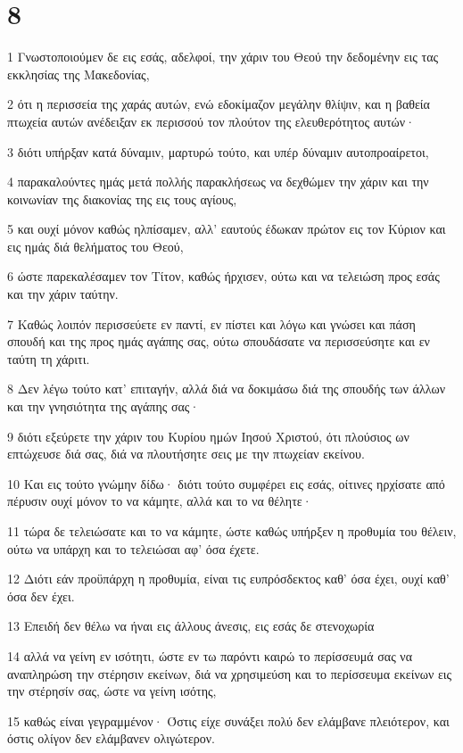 \chapter{8}

\par 1 Γνωστοποιούμεν δε εις εσάς, αδελφοί, την χάριν του Θεού την δεδομένην εις τας εκκλησίας της Μακεδονίας,
\par 2 ότι η περισσεία της χαράς αυτών, ενώ εδοκίμαζον μεγάλην θλίψιν, και η βαθεία πτωχεία αυτών ανέδειξαν εκ περισσού τον πλούτον της ελευθερότητος αυτών·
\par 3 διότι υπήρξαν κατά δύναμιν, μαρτυρώ τούτο, και υπέρ δύναμιν αυτοπροαίρετοι,
\par 4 παρακαλούντες ημάς μετά πολλής παρακλήσεως να δεχθώμεν την χάριν και την κοινωνίαν της διακονίας της εις τους αγίους,
\par 5 και ουχί μόνον καθώς ηλπίσαμεν, αλλ' εαυτούς έδωκαν πρώτον εις τον Κύριον και εις ημάς διά θελήματος του Θεού,
\par 6 ώστε παρεκαλέσαμεν τον Τίτον, καθώς ήρχισεν, ούτω και να τελειώση προς εσάς και την χάριν ταύτην.
\par 7 Καθώς λοιπόν περισσεύετε εν παντί, εν πίστει και λόγω και γνώσει και πάση σπουδή και της προς ημάς αγάπης σας, ούτω σπουδάσατε να περισσεύσητε και εν ταύτη τη χάριτι.
\par 8 Δεν λέγω τούτο κατ' επιταγήν, αλλά διά να δοκιμάσω διά της σπουδής των άλλων και την γνησιότητα της αγάπης σας·
\par 9 διότι εξεύρετε την χάριν του Κυρίου ημών Ιησού Χριστού, ότι πλούσιος ων επτώχευσε διά σας, διά να πλουτήσητε σεις με την πτωχείαν εκείνου.
\par 10 Και εις τούτο γνώμην δίδω· διότι τούτο συμφέρει εις εσάς, οίτινες ηρχίσατε από πέρυσιν ουχί μόνον το να κάμητε, αλλά και το να θέλητε·
\par 11 τώρα δε τελειώσατε και το να κάμητε, ώστε καθώς υπήρξεν η προθυμία του θέλειν, ούτω να υπάρχη και το τελειώσαι αφ' όσα έχετε.
\par 12 Διότι εάν προϋπάρχη η προθυμία, είναι τις ευπρόσδεκτος καθ' όσα έχει, ουχί καθ' όσα δεν έχει.
\par 13 Επειδή δεν θέλω να ήναι εις άλλους άνεσις, εις εσάς δε στενοχωρία
\par 14 αλλά να γείνη εν ισότητι, ώστε εν τω παρόντι καιρώ το περίσσευμά σας να αναπληρώση την στέρησιν εκείνων, διά να χρησιμεύση και το περίσσευμα εκείνων εις την στέρησίν σας, ώστε να γείνη ισότης,
\par 15 καθώς είναι γεγραμμένον· Όστις είχε συνάξει πολύ δεν ελάμβανε πλειότερον, και όστις ολίγον δεν ελάμβανεν ολιγώτερον.
